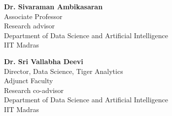 \vspace{-\parskip}
\begingroup
\singlespacing
\begin{flushright}
\textbf{Dr. Sivaraman Ambikasaran}    \\
Associate Professor               \\
Research advisor        \\[6pt]
Department of Data Science and Artificial Intelligence  \\
IIT Madras              \\

\par
\vspace{3\parskip}

\textbf{Dr. Sri Vallabha Deevi}    \\
Director, Data Science, Tiger Analytics \\
Adjunct Faculty                         \\
Research co-advisor             \\[6pt]
Department of Data Science and Artificial Intelligence  \\
IIT Madras              \\
\end{flushright}
\endgroup
\par
